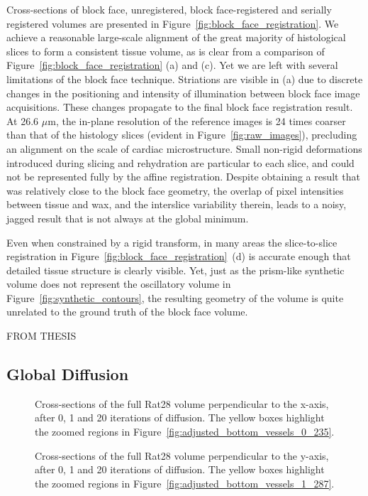   Cross-sections of block face, unregistered, block face-registered and serially registered volumes are presented in Figure~\ref{fig:block_face_registration}. We achieve a reasonable large-scale alignment of the great majority of histological slices to form a consistent tissue volume, as is clear from a comparison of Figure~\ref{fig:block_face_registration} (a) and (c). Yet we are left with several limitations of the block face technique. Striations are visible in (a) due to discrete changes in the positioning and intensity of illumination between block face image acquisitions. These changes propagate to the final block face registration result. At 26.6 $\mu$m, the in-plane resolution of the reference images is 24 times coarser than that of the histology slices (evident in Figure~\ref{fig:raw_images}), precluding an alignment on the scale of cardiac microstructure. Small non-rigid deformations introduced during slicing and rehydration are particular to each slice, and could not be represented fully by the affine registration. Despite obtaining a result that was relatively close to the block face geometry, the overlap of pixel intensities between tissue and wax, and the interslice variability therein, leads to a noisy, jagged result that is not always at the global minimum.
  
  Even when constrained by a rigid transform, in many areas the slice-to-slice registration in Figure~\ref{fig:block_face_registration}~(d) is accurate enough that detailed tissue structure is clearly visible. Yet, just as the prism-like synthetic volume does not represent the oscillatory volume in Figure~\ref{fig:synthetic_contours}, the resulting geometry of the volume is quite unrelated to the ground truth of the block face volume.
  
  FROM THESIS
    
  \subsection{Global Diffusion} %
  \label{sub:global_diffusion}
    \begin{figure}[htbp]
      \caption{Cross-sections of the full Rat28 volume perpendicular to the x-axis, after 0, 1 and 20 iterations of diffusion. The yellow boxes highlight the zoomed regions in Figure~\ref{fig:adjusted_bottom_vessels_0_235}.}
    \end{figure}

    \begin{figure}[htbp]
      \caption{Cross-sections of the full Rat28 volume perpendicular to the y-axis, after 0, 1 and 20 iterations of diffusion. The yellow boxes highlight the zoomed regions in Figure~\ref{fig:adjusted_bottom_vessels_1_287}.}
    \end{figure}
    

